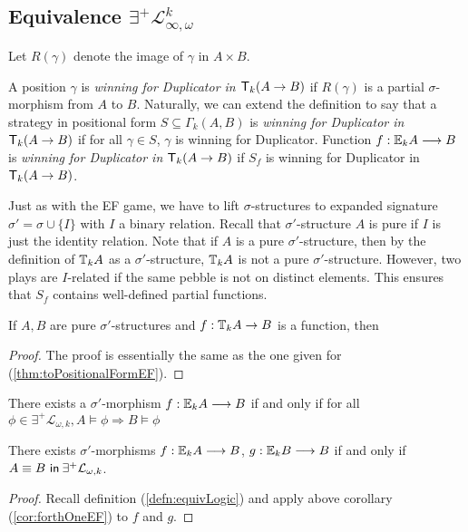\subsection{Equivalence $\exists^{+}\mathcal{L}^{k}_{\infty,\omega}$}
Let $R(\gamma)$ denote the image of $\gamma$ in $A \times B$.
\begin{defn}
A position $\gamma$ is \textit{winning for Duplicator in ${\mathsf{T}_{k}(A \rightarrow B)}$} if $R(\gamma)$ is a partial $\sigma$-morphism from $A$ to $B$.  
Naturally, we can extend the definition to say that a strategy in positional form $S \subseteq \Gamma_{k}(A,B)$ is \textit{winning for Duplicator in ${\mathsf{T}_{k}(A \rightarrow B)}$} if for all $\gamma \in S$, $\gamma$ is winning for Duplicator. Function $f:{\mathbb{E}_{k}A} \longrightarrow B$ is \textit{winning for Duplicator in ${\mathsf{T}_{k}(A \rightarrow B)}$} if $S_{f}$ is winning for Duplicator in ${\mathsf{T}_{k}(A \rightarrow B)}$.
\end{defn}
Just as with the EF game, we have to lift $\sigma$-structures to expanded signature $\sigma' = \sigma \cup \{I\}$ with $I$ a binary relation. Recall that $\sigma'$-structure $A$ is pure if $I$ is just the identity relation. Note that if $A$ is a pure $\sigma'$-structure, then by the definition of ${\mathbb{T}_{k}A}$ as a $\sigma'$-structure, ${\mathbb{T}_{k}A}$ is not a pure $\sigma'$-structure. However, two plays are $I$-related if the same pebble is not on distinct elements. This ensures that $S_{f}$ contains well-defined partial functions.
\begin{thm}
If $A,B$ are pure $\sigma'$-structures and $f:{\mathbb{T}_{k}A} \rightarrow B$ is a function, then
\begin{proof}
The proof is essentially the same as the one given for (\ref{thm:toPositionalFormEF}). 
\end{proof}
\begin{cor}[]
There exists a $\sigma'$-morphism $f:{\mathbb{E}_{k}A} \longrightarrow B$ if and only if for all $\phi \in \exists^{+}\mathcal{L}_{\omega,k}, A \vDash \phi \Rightarrow B \vDash \phi$
\label{cor:forthOneP}
\end{cor}
\begin{cor}
There exists $\sigma'$-morphisms $f:{\mathbb{E}_{k}A} \longrightarrow B$, $g:{\mathbb{E}_{k}B} \longrightarrow B$ if and only if ${A \equiv B \ \mathsf{in}\: \exists^{+}\mathcal{L}_{\omega,k}}$. 
\begin{proof}
Recall definition (\ref{defn:equivLogic}) and apply above corollary (\ref{cor:forthOneEF}) to $f$ and $g$.  
\end{proof}
\label{cor:forthP}
\end{cor}
\label{thm:toPositionalFormP}
\end{thm}
